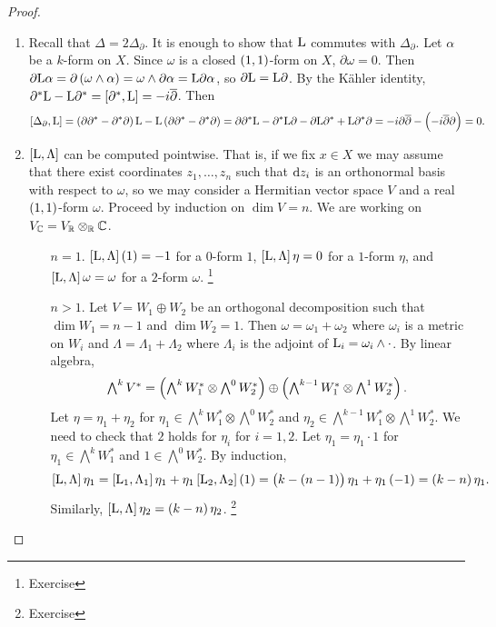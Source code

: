 \begin{proof}
\hfill
\begin{enumerate}
\item Recall that $ \Delta = 2\Delta_\partial $. It is enough to show that $ \mathrm{L} $ commutes with $ \Delta_\partial $. Let $ \alpha $ be a $ k $-form on $ X $. Since $ \omega $ is a closed $ \br{1, 1} $-form on $ X $, $ \partial\omega = 0 $. Then $ \partial\L\alpha = \partial\br{\omega \wedge \alpha} = \omega \wedge \partial\alpha = \L\partial\alpha $, so $ \partial\mathrm{L} = \mathrm{L}\partial $. By the K\"ahler identity, $ \partial^*\L - \L\partial^* = \sbr{\partial^*, \L} = -i\overline{\partial} $. Then
$$ \sbr{\Delta_\partial, \L} = \br{\partial\partial^* - \partial^*\partial}\L - \L\br{\partial\partial^* - \partial^*\partial} = \partial\partial^*\L - \partial^*\L\partial - \partial\L\partial^* + \L\partial^*\partial = -i\partial\overline{\partial} - \br{-i\overline{\partial}\partial} = 0. $$
\item $ \sbr{\L, \Lambda} $ can be computed pointwise. That is, if we fix $ x \in X $ we may assume that there exist coordinates $ z_1, \dots, z_n $ such that $ \mathrm{d} z_i $ is an orthonormal basis with respect to $ \omega $, so we may consider a Hermitian vector space $ V $ and a real $ \br{1, 1} $-form $ \omega $. Proceed by induction on $ \dim V = n $. We are working on $ V_{\mathbb{C}} = V_{\mathbb{R}} \otimes_{\mathbb{R}} \mathbb{C} $.
\begin{itemize}[leftmargin=0.5in]
\item[$ n = 1 $.] $ \sbr{\L, \Lambda}\br{1} = -1 $ for a $ 0 $-form $ 1 $, $ \sbr{\L, \Lambda}\eta = 0 $ for a $ 1 $-form $ \eta $, and $ \sbr{\L, \Lambda}\omega = \omega $ for a $ 2 $-form $ \omega $. \footnote{Exercise}
\item[$ n > 1 $.] Let $ V = W_1 \oplus W_2 $ be an orthogonal decomposition such that $ \dim W_1 = n - 1 $ and $ \dim W_2 = 1 $. Then $ \omega = \omega_1 + \omega_2 $ where $ \omega_i $ is a metric on $ W_i $ and $ \Lambda = \Lambda_1 + \Lambda_2 $ where $ \Lambda_i $ is the adjoint of $ \mathrm{L}_i = \omega_i \wedge \cdot $. By linear algebra,
$$ \textstyle\bigwedge^kV^* = \br{\textstyle\bigwedge^kW_1^* \otimes \textstyle\bigwedge^0W_2^*} \oplus \br{\textstyle\bigwedge^{k - 1}W_1^* \otimes \textstyle\bigwedge^1W_2^*}. $$
Let $ \eta = \eta_1 + \eta_2 $ for $ \eta_1 \in \bigwedge^kW_1^* \otimes \bigwedge^0W_2^* $ and $ \eta_2 \in \bigwedge^{k - 1}W_1^* \otimes \bigwedge^1W_2^* $. We need to check that $ 2 $ holds for $ \eta_i $ for $ i = 1, 2 $. Let $ \eta_1 = \eta_1 \cdot 1 $ for $ \eta_1 \in \bigwedge^kW_1^* $ and $ 1 \in \bigwedge^0W_2^* $. By induction,
$$ \sbr{\L, \Lambda}\eta_1 = \sbr{\L_1, \Lambda_1}\eta_1 + \eta_1\sbr{\L_2, \Lambda_2}\br{1} = \br{k - \br{n - 1}}\eta_1 + \eta_1\br{-1} = \br{k - n}\eta_1. $$
Similarly, $ \sbr{\L, \Lambda}\eta_2 = \br{k - n}\eta_2 $. \footnote{Exercise}
\end{itemize}
\end{enumerate}
\end{proof}


